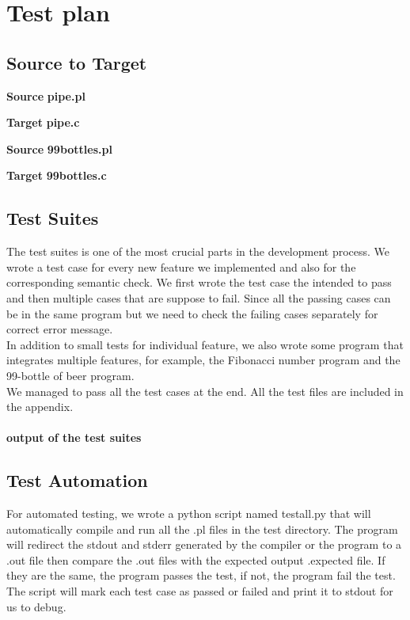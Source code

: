 \documentclass[./Report_main.tex]{subfiles}
\begin{document}


\chapter{Test plan}
\section{Source to Target}
\textbf{Source}
\textbf{pipe.pl}

\textbf{Target}
\textbf{pipe.c}

\textbf{Source}
\textbf{99bottles.pl}

\textbf{Target}
\textbf{99bottles.c}

\section{Test Suites}
The test suites is one of the most crucial parts in the development process. We wrote a test case for every new feature we implemented and also for the corresponding semantic check. We first wrote the test case the intended to pass and then multiple cases that are suppose to fail. Since all the passing cases can be in the same program but we need to check the failing cases separately for correct error message.\\
In addition to small tests for individual feature, we also wrote some program that integrates multiple features, for example, the Fibonacci number program and the 99-bottle of beer program.\\
We managed to pass all the test cases at the end. All the test files are included in the appendix.\\
\vspace{5mm}\\
\textbf{output of the test suites}

\section{Test Automation}
For automated testing, we wrote a python script named testall.py that will automatically compile and run all the .pl files in the test directory. The program will redirect the stdout and stderr generated by the compiler or the program to a .out file then compare the .out files with the expected output .expected file. If they are the same, the program passes the test, if not, the program fail the test. The script will mark each test case as passed or failed and print it to stdout for us to debug.\\
\end{document}
